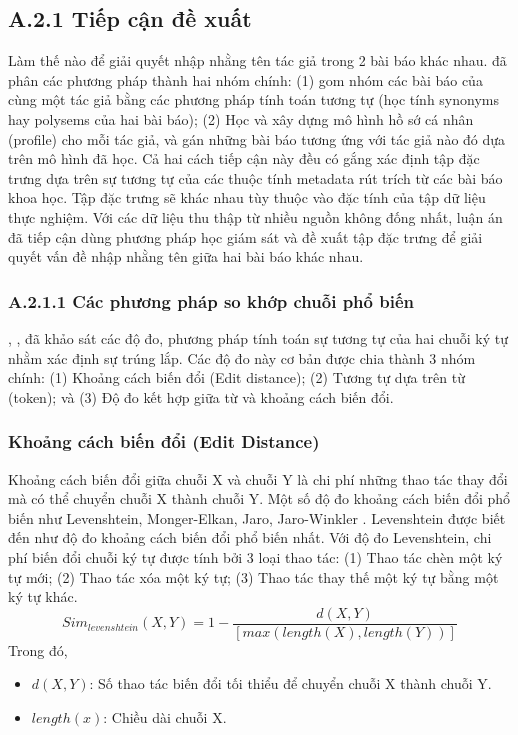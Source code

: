 \subsection*{A.2.1 Tiếp cận đề xuất}
Làm thế nào để giải quyết nhập nhằng tên tác giả trong 2 bài báo khác nhau. \cite{Ferreira:2012:BSA:2350036.2350040} đã phân các phương pháp thành hai nhóm chính: (1) gom nhóm các bài báo của cùng một tác giả bằng các phương pháp tính toán tương tự (học tính synonyms hay polysems của hai bài báo); (2) Học và xây dựng mô hình hồ sớ cá nhân (profile) cho mỗi tác giả, và gán những bài báo tương ứng với tác giả nào đó dựa trên mô hình đã học. Cả hai cách tiếp cận này đều có gắng xác định tập đặc trưng dựa trên sự tương tự của các thuộc tính metadata rút trích từ các bài báo khoa học. Tập đặc trưng sẽ khác nhau tùy thuộc vào đặc tính của tập dữ liệu thực nghiệm. Với các dữ liệu thu thập từ nhiều nguồn không đống nhất, luận án đã tiếp cận dùng phương pháp học giám sát và đề xuất tập đặc trưng để giải quyết vấn đề nhập nhằng tên giữa hai bài báo khác nhau.
\subsubsection*{A.2.1.1 Các phương pháp so khớp chuỗi phổ biến}
\citet{Bilenko:2003:ANM:1137237.1137369}, \citet{CohenRF03}, đã khảo sát các độ đo, phương pháp tính toán sự tương tự của hai chuỗi ký tự nhằm xác định sự trúng lắp. Các độ đo này cơ bản được chia thành 3 nhóm chính: (1) Khoảng cách biến đổi (Edit distance); (2) Tương tự dựa trên từ (token); và (3) Độ đo kết hợp giữa từ và khoảng cách biến đổi.

\subsubsection*{Khoảng cách biến đổi (Edit Distance)} 
Khoảng cách biến đổi giữa chuỗi X và chuỗi Y là chi phí những thao tác thay đổi mà có thể chuyển chuỗi X thành chuỗi Y. Một số độ đo khoảng cách biến đổi phổ biến như Levenshtein, Monger-Elkan, Jaro, Jaro-Winkler \cite{CohenRF03}. Levenshtein được biết đến như độ đo khoảng cách biến đổi phổ biến nhất. Với độ đo Levenshtein, chi phí biến đổi chuỗi ký tự được tính bởi 3 loại thao tác: (1) Thao tác chèn một ký tự mới; (2) Thao tác xóa một ký tự; (3) Thao tác thay thế một ký tự bằng một ký tự khác.
\begin{equation}
Sim_{levenshtein}(X,Y) = 1 - \displaystyle\frac{d(X,Y)}{[max(length(X), length(Y))]}
\end{equation}
Trong đó,
\begin{itemize}
\item $d(X,Y)$: Số thao tác biến đổi tối thiểu để chuyển chuỗi X thành chuỗi Y.
\item $length(x)$: Chiều dài chuỗi X.
\end{itemize}


